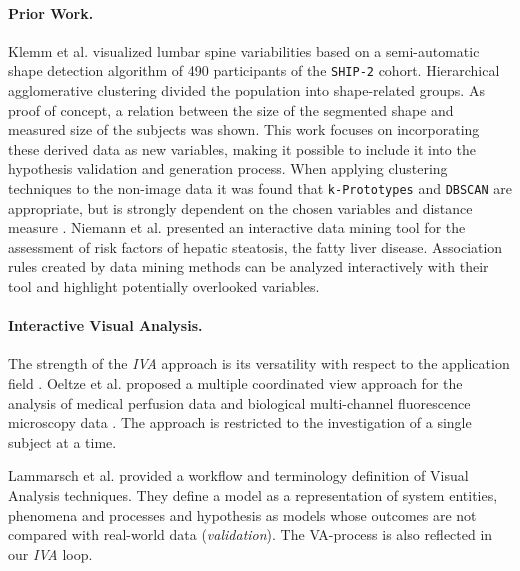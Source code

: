 \documentclass[journal]{style/vgtc} 			          %
\newcommand{\add}[1]{\textcolor{blue}{\uline{#1}}}
\begin{document}
\paragraph{Prior Work.}
Klemm et al. \cite{Klemm2013VMV} visualized lumbar spine variabilities based on a semi-automatic shape detection algorithm of 490 participants of the \texttt{SHIP-2} cohort.
%
Hierarchical agglomerative clustering divided the population into shape-related groups.
%
As proof of concept, a relation between the size of the segmented shape and measured size of the subjects was shown.
%
This work focuses on incorporating these derived data as new variables, making it possible to include it into the hypothesis validation and generation process.
%
When applying clustering techniques to the non-image data it was found that \texttt{k-Prototypes} and \texttt{DBSCAN} are appropriate, but is strongly dependent on the chosen variables and distance measure \cite{Klemm2014BVM}.
%
Niemann et al. \cite{Niemann2014} presented an interactive data mining tool for the assessment of risk factors of hepatic steatosis, the fatty liver disease.
%
Association rules created by data mining methods can be analyzed interactively with their tool and highlight potentially overlooked variables.
%

\paragraph{Interactive Visual Analysis.}
The strength of the \emph{IVA} approach is its versatility with respect to the application field \cite{Konyha2009}.
%
Oeltze et al. proposed a multiple coordinated view approach for the analysis of medical perfusion data \cite{Oeltze2007} and biological multi-channel fluorescence microscopy data \cite{Oeltze2011}.
%
The approach is restricted to the investigation of a single subject at a time.
%

Lammarsch et al. \cite{Lammarsch2011} provided a workflow and terminology definition of Visual Analysis techniques.
%
They define a model as a representation of system entities, phenomena and processes and hypothesis as models whose outcomes are not compared with real-world data (\emph{validation}).
%
The VA-process is also reflected in our \emph{IVA} loop.
\end{document}
